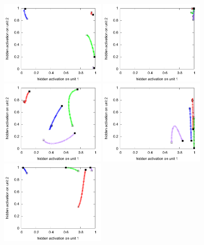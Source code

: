 \begin{figure}[H]
  \centering
  \includegraphics[width=0.45\textwidth]{img/hid-tlr-bad-static.pdf}  
  \includegraphics[width=0.45\textwidth]{img/hid-tlr-bad-tiny.pdf}  
  \includegraphics[width=0.45\textwidth]{img/hid-tlr-bad-init.pdf}  
  \includegraphics[width=0.45\textwidth]{img/hid-tlr-bad-weird.pdf}  
  \includegraphics[width=0.45\textwidth]{img/hid-tlr-good-static.pdf}  

\end{figure}
